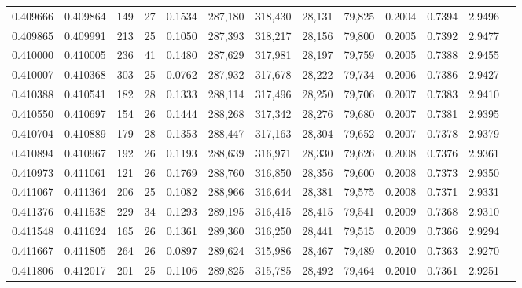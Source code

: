 \begin{tabular}{rrrrrrrrrrrrr}
0.409666 & 0.409864 &    149 &    27 &                                     0.1534 & 287,180 & 318,430 &  28,131 &  79,825 & 0.2004 & 0.7394 & 2.9496 \\
0.409865 & 0.409991 &    213 &    25 &                                     0.1050 & 287,393 & 318,217 &  28,156 &  79,800 & 0.2005 & 0.7392 & 2.9477 \\
0.410000 & 0.410005 &    236 &    41 &                                     0.1480 & 287,629 & 317,981 &  28,197 &  79,759 & 0.2005 & 0.7388 & 2.9455 \\
0.410007 & 0.410368 &    303 &    25 &                                     0.0762 & 287,932 & 317,678 &  28,222 &  79,734 & 0.2006 & 0.7386 & 2.9427 \\
0.410388 & 0.410541 &    182 &    28 &                                     0.1333 & 288,114 & 317,496 &  28,250 &  79,706 & 0.2007 & 0.7383 & 2.9410 \\
0.410550 & 0.410697 &    154 &    26 &                                     0.1444 & 288,268 & 317,342 &  28,276 &  79,680 & 0.2007 & 0.7381 & 2.9395 \\
0.410704 & 0.410889 &    179 &    28 &                                     0.1353 & 288,447 & 317,163 &  28,304 &  79,652 & 0.2007 & 0.7378 & 2.9379 \\
0.410894 & 0.410967 &    192 &    26 &                                     0.1193 & 288,639 & 316,971 &  28,330 &  79,626 & 0.2008 & 0.7376 & 2.9361 \\
0.410973 & 0.411061 &    121 &    26 &                                     0.1769 & 288,760 & 316,850 &  28,356 &  79,600 & 0.2008 & 0.7373 & 2.9350 \\
0.411067 & 0.411364 &    206 &    25 &                                     0.1082 & 288,966 & 316,644 &  28,381 &  79,575 & 0.2008 & 0.7371 & 2.9331 \\
0.411376 & 0.411538 &    229 &    34 &                                     0.1293 & 289,195 & 316,415 &  28,415 &  79,541 & 0.2009 & 0.7368 & 2.9310 \\
0.411548 & 0.411624 &    165 &    26 &                                     0.1361 & 289,360 & 316,250 &  28,441 &  79,515 & 0.2009 & 0.7366 & 2.9294 \\
0.411667 & 0.411805 &    264 &    26 &                                     0.0897 & 289,624 & 315,986 &  28,467 &  79,489 & 0.2010 & 0.7363 & 2.9270 \\
0.411806 & 0.412017 &    201 &    25 &                                     0.1106 & 289,825 & 315,785 &  28,492 &  79,464 & 0.2010 & 0.7361 & 2.9251 \\

\end{tabular}
